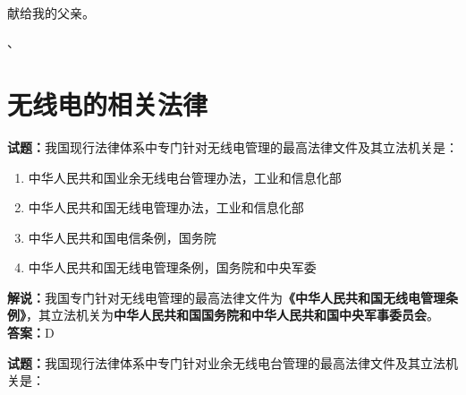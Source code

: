 \documentclass{ctexbook}
\newcommand{\commit}{\dots~(in \emph{packed-refs})}}
\begin{document}

\title{} %
\author{\large \texttt{BG7XTQ（原JJ1DSB）编著}} %
\date{\large{编译日期：\texttt \today}\\版本：\texttt{\commit}在分支\texttt{\branch}上} %

\maketitle%

\thispagestyle{empty}
\vfil
\ \\
\vspace{15em}
\begin{center}
	{\Large 献给我的父亲。}
\end{center}、

\newpage

\tableofcontents%






\chapter{无线电的相关法律}



\noindent\textbf{试题：}我国现行法律体系中专门针对无线电管理的最高法律文件及其立法机关是：

\begin{enumerate}[leftmargin=3em]
	\item 中华人民共和国业余无线电台管理办法，工业和信息化部
	\item 中华人民共和国无线电管理办法，工业和信息化部
	\item 中华人民共和国电信条例，国务院
	\item 中华人民共和国无线电管理条例，国务院和中央军委
\end{enumerate}

\noindent\textbf{解说：}我国专门针对无线电管理的最高法律文件为\textbf{《中华人民共和国无线电管理条例》}，其立法机关为\textbf{中华人民共和国国务院和中华人民共和国中央军事委员会}。\\\noindent\textbf{答案：}D

\bigskip


\noindent\textbf{试题：}我国现行法律体系中专门针对业余无线电台管理的最高法律文件及其立法机关是：
\end{document}
